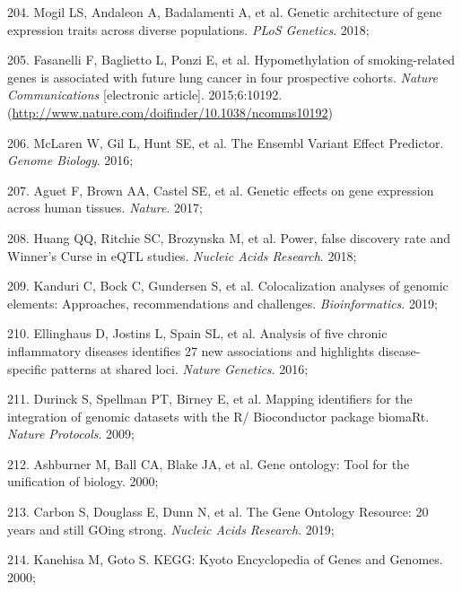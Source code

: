 \documentclass[11pt,oneside]{bristolthesis}
\newenvironment{cslreferences}%
  {}%
  {\par}
\begin{document}
\begin{cslreferences}
\leavevmode\hypertarget{ref-Mogil2018}{}%
204. Mogil LS, Andaleon A, Badalamenti A, et al. Genetic architecture of gene expression traits across diverse populations. \emph{PLoS Genetics}. 2018;

\leavevmode\hypertarget{ref-Fasanelli2015}{}%
205. Fasanelli F, Baglietto L, Ponzi E, et al. Hypomethylation of smoking-related genes is associated with future lung cancer in four prospective cohorts. \emph{Nature Communications} {[}electronic article{]}. 2015;6:10192. (\url{http://www.nature.com/doifinder/10.1038/ncomms10192})

\leavevmode\hypertarget{ref-McLaren2016}{}%
206. McLaren W, Gil L, Hunt SE, et al. The Ensembl Variant Effect Predictor. \emph{Genome Biology}. 2016;

\leavevmode\hypertarget{ref-Aguet2017}{}%
207. Aguet F, Brown AA, Castel SE, et al. Genetic effects on gene expression across human tissues. \emph{Nature}. 2017;

\leavevmode\hypertarget{ref-Huang2018}{}%
208. Huang QQ, Ritchie SC, Brozynska M, et al. Power, false discovery rate and Winner's Curse in eQTL studies. \emph{Nucleic Acids Research}. 2018;

\leavevmode\hypertarget{ref-Kanduri2019}{}%
209. Kanduri C, Bock C, Gundersen S, et al. Colocalization analyses of genomic elements: Approaches, recommendations and challenges. \emph{Bioinformatics}. 2019;

\leavevmode\hypertarget{ref-Ellinghaus2016}{}%
210. Ellinghaus D, Jostins L, Spain SL, et al. Analysis of five chronic inflammatory diseases identifies 27 new associations and highlights disease-specific patterns at shared loci. \emph{Nature Genetics}. 2016;

\leavevmode\hypertarget{ref-Durinck2009}{}%
211. Durinck S, Spellman PT, Birney E, et al. Mapping identifiers for the integration of genomic datasets with the R/ Bioconductor package biomaRt. \emph{Nature Protocols}. 2009;

\leavevmode\hypertarget{ref-Ashburner2000}{}%
212. Ashburner M, Ball CA, Blake JA, et al. Gene ontology: Tool for the unification of biology. 2000;

\leavevmode\hypertarget{ref-Carbon2019}{}%
213. Carbon S, Douglass E, Dunn N, et al. The Gene Ontology Resource: 20 years and still GOing strong. \emph{Nucleic Acids Research}. 2019;

\leavevmode\hypertarget{ref-Kanehisa2000}{}%
214. Kanehisa M, Goto S. KEGG: Kyoto Encyclopedia of Genes and Genomes. 2000;


\end{cslreferences}
\end{document}
